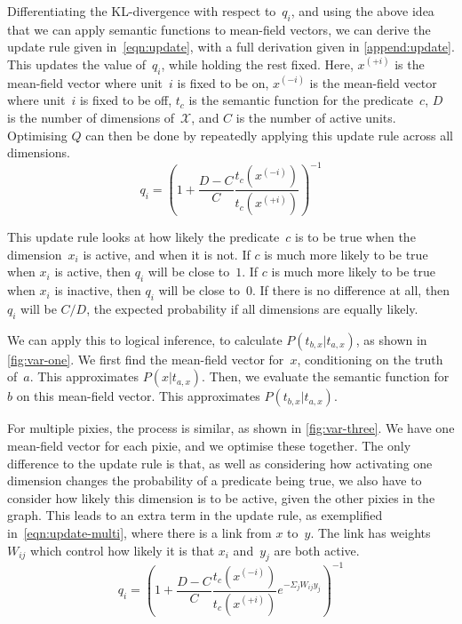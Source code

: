 \documentclass[11pt]{article}
\begin{document}
Differentiating the KL-divergence with respect to~$q_i$,
and using the above idea that we can apply semantic functions to mean-field vectors,
we can derive the update rule given in~\cref{eqn:update},
with a full derivation given in \cref{append:update}.
This updates the value of~$q_i$, while holding the rest fixed.
Here, $x^{(+i)}$ is the mean-field vector where unit~$i$ is fixed to be on,
$x^{(-i)}$ is the mean-field vector where unit~$i$ is fixed to be off,
$t_c$ is the semantic function for the predicate~$c$,
$D$ is the number of dimensions of~$\mathcal{X}$,
and $C$ is the number of active units.
Optimising $Q$ can then be done by repeatedly applying this update rule across all dimensions.
%
\vspace*{-1mm}
\begin{equation}
q_i = \left(1 + \frac{D-C}{C} \frac{t_c\left(x^{(-i)}\right)}{t_c\left(x^{(+i)}\right)} \right)^{-1}
\label{eqn:update}
\end{equation}

This update rule looks at how likely the predicate~$c$ is to be true
when the dimension~$x_i$ is active, and when it is not.
If $c$ is much more likely to be true when $x_i$ is active,
then $q_i$ will be close to~$1$.
If $c$ is much more likely to be true when $x_i$ is inactive,
then $q_i$ will be close to~$0$.
If there is no difference at all,
then $q_i$ will be $C/D$, the expected probability if all dimensions are equally likely.

We can apply this to logical inference,
to calculate $P(t_{b,x}|t_{a,x})$, as shown in \cref{fig:var-one}.
We first find the mean-field vector for~$x$, conditioning on the truth of~$a$.
This approximates $P(x|t_{a,x})$.
Then, we evaluate the semantic function for $b$ on this mean-field vector.
This approximates $P(t_{b,x}|t_{a,x})$.

For multiple pixies, the process is similar,
as shown in \cref{fig:var-three}.
We have one mean-field vector for each pixie,
and we optimise these together.
The only difference to the update rule is that, as well as considering
how activating one dimension changes the probability of a predicate being true,
we also have to consider how likely this dimension is to be active,
given the other pixies in the graph.
This leads to an extra term in the update rule, as exemplified in~\cref{eqn:update-multi},
where there is a link from $x$ to~$y$.
The link has weights~$W_{ij}$ which control how likely it is that $x_i$ and~$y_j$ are both active.
%
\vspace*{-3mm}
\begin{equation}
q_i = \left(1 + \frac{D-C}{C}
  \frac{t_c\left(x^{(-i)}\right)}{t_c\left(x^{(+i)}\right)}
  e^{-\Sigma_j W_{ij}y_j}
\right)^{-1}
\label{eqn:update-multi}
\end{equation}
\end{document}
